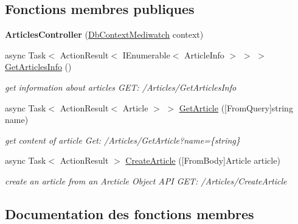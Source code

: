 \subsection*{Fonctions membres publiques}
\begin{DoxyCompactItemize}
\item 
\mbox{\label{class_blazing_blog_1_1_server_1_1_controllers_1_1_articles_controller_a3881e802459fed1ecf975c20c9b17444}} 
{\bfseries Articles\+Controller} (\hyperlink{class_server_1_1_db_context_mediwatch}{Db\+Context\+Mediwatch} context)
\item 
async Task$<$ Action\+Result$<$ I\+Enumerable$<$ Article\+Info $>$ $>$ $>$ \hyperlink{class_blazing_blog_1_1_server_1_1_controllers_1_1_articles_controller_a9970ba338169d8ef258c10663bf211b1}{Get\+Articles\+Info} ()
\begin{DoxyCompactList}\small\item\em get information about articles G\+ET\+: /\+Articles/\+Get\+Articles\+Info \end{DoxyCompactList}\item 
async Task$<$ Action\+Result$<$ Article $>$ $>$ \hyperlink{class_blazing_blog_1_1_server_1_1_controllers_1_1_articles_controller_a69e1b42a4f3198d4737296e661f95a75}{Get\+Article} (\mbox{[}From\+Query\mbox{]}string name)
\begin{DoxyCompactList}\small\item\em get content of article Get\+: /\+Articles/\+Get\+Article?name=\{string\} \end{DoxyCompactList}\item 
async Task$<$ Action\+Result $>$ \hyperlink{class_blazing_blog_1_1_server_1_1_controllers_1_1_articles_controller_af37d427d00f7f410f1719d8fd9a47f68}{Create\+Article} (\mbox{[}From\+Body\mbox{]}Article article)
\begin{DoxyCompactList}\small\item\em create an article from an Arcticle Object A\+PI G\+ET\+: /\+Articles/\+Create\+Article \end{DoxyCompactList}\end{DoxyCompactItemize}


\subsection{Documentation des fonctions membres}
\mbox{\label{class_blazing_blog_1_1_server_1_1_controllers_1_1_articles_controller_af37d427d00f7f410f1719d8fd9a47f68}} 
